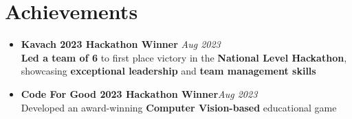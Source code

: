 \section{Achievements}
\begin{itemize}
	\item \textbf{Kavach 2023 Hackathon Winner}  \hfill \textit{Aug 2023} \\
	      \textbf{Led a team of 6} to first place victory in the \textbf{National Level Hackathon}, showcasing \textbf{exceptional leadership} and \textbf{team management skills}
	\item \textbf{Code For Good 2023 Hackathon Winner}\hfill \textit{Aug 2023} \\
	      Developed an award-winning \textbf{Computer Vision-based} educational game
\end{itemize}